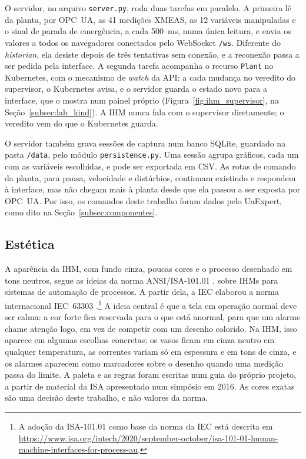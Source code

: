 O servidor, no arquivo \texttt{server.py}, roda duas tarefas em paralelo. A primeira lê da planta, por OPC~UA, as 41 medições XMEAS, as 12 variáveis manipuladas e o sinal de parada de emergência, a cada 500~ms, numa única leitura, e envia os valores a todos os navegadores conectados pelo WebSocket \texttt{/ws}. Diferente do \textit{historian}, ela desiste depois de três tentativas sem conexão, e a reconexão passa a ser pedida pela interface. A segunda tarefa acompanha o recurso \texttt{Plant} no Kubernetes, com o mecanismo de \textit{watch} da API: a cada mudança no veredito do supervisor, o Kubernetes avisa, e o servidor guarda o estado novo para a interface, que o mostra num painel próprio (Figura~\ref{fig:ihm_supervisor}, na Seção~\ref{subsec:lab_kind}). A IHM nunca fala com o supervisor diretamente; o veredito vem do que o Kubernetes guarda.

O servidor também grava sessões de captura num banco SQLite, guardado na pasta \texttt{/data}, pelo módulo \texttt{persistence.py}. Uma sessão agrupa gráficos, cada um com as variáveis escolhidas, e pode ser exportada em CSV. As rotas de comando da planta, para pausa, velocidade e distúrbios, continuam existindo e respondem à interface, mas não chegam mais à planta desde que ela passou a ser exposta por OPC~UA. Por isso, os comandos deste trabalho foram dados pelo UaExpert, como dito na Seção~\ref{subsec:componentes}.

\subsection{Estética}
\label{subsec:ihm_estetica}

A aparência da IHM, com fundo cinza, poucas cores e o processo desenhado em tons neutros, segue as ideias da norma ANSI/ISA-101.01 \cite{ISA101}, sobre IHMs para sistemas de automação de processos. A partir dela, a IEC elaborou a norma internacional IEC~63303 \cite{IEC63303}.\footnote{A adoção da ISA-101.01 como base da norma da IEC está descrita em \url{https://www.isa.org/intech/2020/september-october/isa-101-01-human-machine-interfaces-for-process-au}.} A ideia central é que a tela em operação normal deve ser calma: a cor forte fica reservada para o que está anormal, para que um alarme chame atenção logo, em vez de competir com um desenho colorido. Na IHM, isso aparece em algumas escolhas concretas: os vasos ficam em cinza neutro em qualquer temperatura, as correntes variam só em espessura e em tons de cinza, e os alarmes aparecem como marcadores sobre o desenho quando uma medição passa do limite. A paleta e as regras foram escritas num guia do próprio projeto, a partir de material da ISA apresentado num simpósio em 2016. As cores exatas são uma decisão deste trabalho, e não valores da norma.

